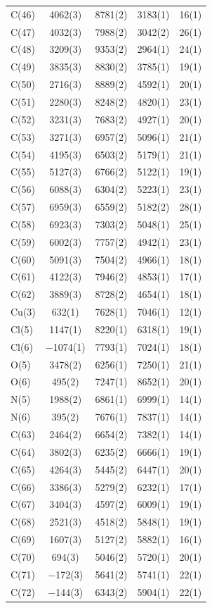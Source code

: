 \begin{center}
{\begin{supertabular}{lcccc}
C(46)&4062(3)&8781(2)&3183(1)&16(1)\\
C(47)&4032(3)&7988(2)&3042(2)&26(1)\\
C(48)&3209(3)&9353(2)&2964(1)&24(1)\\
C(49)&3835(3)&8830(2)&3785(1)&19(1)\\
C(50)&2716(3)&8889(2)&4592(1)&20(1)\\
C(51)&2280(3)&8248(2)&4820(1)&23(1)\\
C(52)&3231(3)&7683(2)&4927(1)&20(1)\\
C(53)&3271(3)&6957(2)&5096(1)&21(1)\\
C(54)&4195(3)&6503(2)&5179(1)&21(1)\\
C(55)&5127(3)&6766(2)&5122(1)&19(1)\\
C(56)&6088(3)&6304(2)&5223(1)&23(1)\\
C(57)&6959(3)&6559(2)&5182(2)&28(1)\\
C(58)&6923(3)&7303(2)&5048(1)&25(1)\\
C(59)&6002(3)&7757(2)&4942(1)&23(1)\\
C(60)&5091(3)&7504(2)&4966(1)&18(1)\\
C(61)&4122(3)&7946(2)&4853(1)&17(1)\\
C(62)&3889(3)&8728(2)&4654(1)&18(1)\\
Cu(3)&632(1)&7628(1)&7046(1)&12(1)\\
Cl(5)&1147(1)&8220(1)&6318(1)&19(1)\\
Cl(6)&$-$1074(1)&7793(1)&7024(1)&18(1)\\
O(5)&3478(2)&6256(1)&7250(1)&21(1)\\
O(6)&495(2)&7247(1)&8652(1)&20(1)\\
N(5)&1988(2)&6861(1)&6999(1)&14(1)\\
N(6)&395(2)&7676(1)&7837(1)&14(1)\\
C(63)&2464(2)&6654(2)&7382(1)&14(1)\\
C(64)&3802(3)&6235(2)&6666(1)&19(1)\\
C(65)&4264(3)&5445(2)&6447(1)&20(1)\\
C(66)&3386(3)&5279(2)&6232(1)&17(1)\\
C(67)&3404(3)&4597(2)&6009(1)&19(1)\\
C(68)&2521(3)&4518(2)&5848(1)&19(1)\\
C(69)&1607(3)&5127(2)&5882(1)&16(1)\\
C(70)&694(3)&5046(2)&5720(1)&20(1)\\
C(71)&$-$172(3)&5641(2)&5741(1)&22(1)\\
C(72)&$-$144(3)&6343(2)&5904(1)&22(1)\\

\end{supertabular}}
\end{center}
